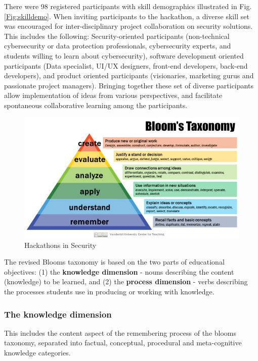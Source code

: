 There were 98 registered participants with skill demographics illustrated in Fig. \ref{Fig:skilldemo}. When inviting participants to the hackathon, a diverse skill set was encouraged for inter-disciplinary project collaboration on security solutions. This includes the following: Security-oriented participants (non-technical cybersecurity or data protection professionals, cybersecurity experts, and students willing to learn about cybersecurity), software development oriented participants (Data specialist, UI/UX designers, front-end developers, back-end developers), and product oriented participants (visionaries, marketing gurus and passionate project managers). Bringing together these set of diverse participants allow implementation of ideas from various perspectives, and facilitate spontaneous collaborative learning among the participants\cite{pe2018designing}.




\begin{figure}[h]
  \centering
  \includegraphics[width=\linewidth]{Blooms-Taxonomy.jpg}
  \caption{Hackathons in Security} \label{Fig:hackcycle} 
\end{figure}

The revised Blooms taxonomy %
is based on the two parts of educational objectives: (1) the \textbf{knowledge dimension} - nouns describing the content (knowledge) to be learned, and (2) the \textbf{process dimension} - verbs describing the processes students use in producing or working with knowledge.


\subsubsection{The knowledge dimension}
This includes the content aspect of the remembering process of the blooms taxonomy, separated into factual, conceptual, procedural and meta-cognitive knowledge categories.

